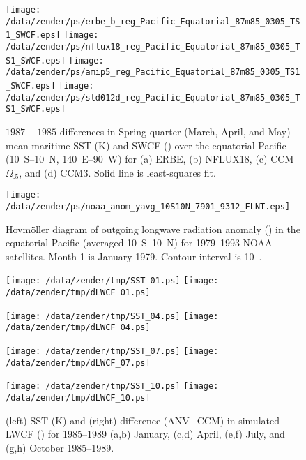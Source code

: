 \documentclass[twocolumn,final,11pt]{article}
\begin{document}
\begin{sidewaysfigure}
\begin{center}
\texttt{[image: /data/zender/ps/erbe\_b\_reg\_Pacific\_Equatorial\_87m85\_0305\_TS1\_SWCF.eps]}%
\texttt{[image: /data/zender/ps/nflux18\_reg\_Pacific\_Equatorial\_87m85\_0305\_TS1\_SWCF.eps]}%
\texttt{[image: /data/zender/ps/amip5\_reg\_Pacific\_Equatorial\_87m85\_0305\_TS1\_SWCF.eps]}%
\texttt{[image: /data/zender/ps/sld012d\_reg\_Pacific\_Equatorial\_87m85\_0305\_TS1\_SWCF.eps]}%
\end{center}
\caption[$1987-1985$ differences in Spring quarter (March, April, and May)
mean maritime SST and SWCF over the equatorial Pacific for ERBE, NFLUX18, CCM$\Omega_{.5}$,
and CCM3]{ 
$1987-1985$ differences in Spring quarter (March, April, and May)
mean maritime SST (\degreee K) and SWCF (\wxmS) over the equatorial
Pacific  (10~\degreee S--10~\degreee N, 140~\degreee E--90~\degreee W)
for (a) ERBE, (b) NFLUX18, (c) CCM$\Omega_{.5}$, and (d) CCM3.
Solid line is least-squares fit.
\label{fig:reg_Pacific_Equatorial_87m85_0305_TS1_SWCF}}   
\end{sidewaysfigure}
\clearpage

\begin{figure*}
\begin{center}
\texttt{[image: /data/zender/ps/noaa\_anom\_yavg\_10S10N\_7901\_9312\_FLNT.eps]}
\end{center}
\caption[Hovm\"oller diagram of outgoing longwave radiation
anomaly in the equatorial Pacific for 1979--1993 NOAA satellites]{ 
Hovm\"oller diagram of outgoing longwave radiation anomaly (\wxmS) in
the equatorial Pacific (averaged 10~\degreee S--10~\degreee N) for 
1979--1993 NOAA satellites.
Month 1 is January 1979.  
Contour interval is 10~\wxmS. 
\label{fig:anom_yavg_10S10N_7901_9312_FLNT}}
\end{figure*}
\clearpage

\begin{figure*}
\begin{center}
\texttt{[image: /data/zender/tmp/SST\_01.ps]}%
\texttt{[image: /data/zender/tmp/dLWCF\_01.ps]}%

\texttt{[image: /data/zender/tmp/SST\_04.ps]}%
\texttt{[image: /data/zender/tmp/dLWCF\_04.ps]}%

\texttt{[image: /data/zender/tmp/SST\_07.ps]}%
\texttt{[image: /data/zender/tmp/dLWCF\_07.ps]}%

\texttt{[image: /data/zender/tmp/SST\_10.ps]}%
\texttt{[image: /data/zender/tmp/dLWCF\_10.ps]}%
\end{center}
\caption[SST and difference (ANV$-$CCM) in simulated LWCF for
1985--1989 January, April, July, and October]{
(left) SST (\degreee K) and (right) difference (ANV$-$CCM) in
simulated LWCF (\wxmS) for 1985--1989 (a,b) January, (c,d) April,
(e,f) July, and (g,h) October 1985--1989.
\label{fig:SST_dLWCF}}   
\end{figure*}
\end{document}
